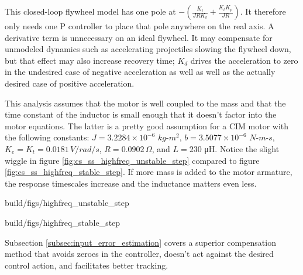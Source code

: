 This closed-loop flywheel model has one pole at
$-\left(\frac{K_t}{JRK_v} + \frac{K_t K_p}{JR}\right)$. It therefore only needs
one P controller to place that pole anywhere on the real axis. A derivative
term is unnecessary on an ideal flywheel. It may compensate for unmodeled
dynamics such as accelerating projectiles slowing the flywheel down, but that
effect may also increase recovery time; $K_d$ drives the acceleration to zero in
the undesired case of negative acceleration as well as well as the actually
desired case of positive acceleration.

This analysis assumes that the motor is well coupled to the mass and that the
time constant of the inductor is small enough that it doesn't factor into the
motor equations. The latter is a pretty good assumption for a CIM motor with the
following constants: $J = 3.2284 \times 10^{-6}$ $kg$-$m^2$,
$b = 3.5077 \times 10^{-6}$ $N$-$m$-$s$, $K_e = K_t = 0.0181 \,V/rad/s$,
$R = 0.0902 \,\Omega$, and $L = 230$ μH. Notice the slight wiggle in figure
\ref{fig:cs_ss_highfreq_unstable_step} compared to figure
\ref{fig:cs_ss_highfreq_stable_step}. If more mass is added to the motor
armature, the response timescales increase and the inductance matters even less.
\begin{bookfigure}
  \begin{minisvg}{2}{build/figs/highfreq_unstable_step}
    \caption{Step response of second-order DC motor plant augmented with
      position ($L = 230$ μH)}
    \label{fig:cs_ss_highfreq_unstable_step}
  \end{minisvg}
  \hfill
  \begin{minisvg}{2}{build/figs/highfreq_stable_step}
    \caption{Step response of first-order DC motor plant augmented with position
      ($L = 0$ μH)}
    \label{fig:cs_ss_highfreq_stable_step}
  \end{minisvg}
\end{bookfigure}

Subsection \ref{subsec:input_error_estimation} covers a superior compensation
method that avoids zeroes in the \gls{controller}, doesn't act against the
desired control action, and facilitates better \gls{tracking}.
